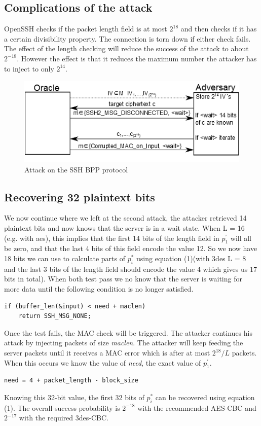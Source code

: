 \documentclass[twocolumn]{article}
\begin{document}
\subsection*{Complications of the attack}
OpenSSH checks if the packet length field is at most $2^{18}$ and then checks if it has a certain divisibility property. The connection is torn down if either check fails. The effect of the length checking will reduce the success of the attack to about $2^{-18}$. However the effect is that it reduces the maximum number the attacker has to inject to only $2^{14}$.

\begin{figure}
	  \centering
    	\includegraphics[scale=.7]{drawing.png}
	\caption{Attack on the SSH BPP protocol~\cite{Albrecht2009}}
	\label{fig:BPPAttack}
\end{figure}

\subsection*{Recovering 32 plaintext bits}
We now continue where we left at the second attack, the attacker retrieved 14 plaintext bits and now knows that the server is in a wait state. When L = 16 (e.g. with aes), this implies that the first 14 bits of the length field in $p^{'}_1$ will all be zero, and that the last 4 bits of this field encode the value 12. So we now have 18 bits we can use to calculate parts of $p^*_i$ using equation (1)(with 3des L = 8 and the last 3 bits of the length field should encode the value 4 which gives us 17 bits in total). When both test pass we no know that the server is waiting for more data until the following condition is no longer satisfied.
\begin{verbatim}
if (buffer_len(&input) < need + maclen)
	return SSH_MSG_NONE;
\end{verbatim}
Once the test fails, the MAC check will be triggered. The attacker continues his attack by injecting packets of size \emph{maclen}. The attacker will keep feeding the server packets until it receives a MAC error which is after at most $2^{18}/L$ packets. When this occurs we know the value of \emph{need}, the exact value of $p_1^{'}$.
\begin{verbatim}
need = 4 + packet_length - block_size
\end{verbatim}
Knowing this 32-bit value, the first 32 bits of $p^*_i$ can be recovered using equation (1).
The overall success probability is $2^{-18}$ with the recommended AES-CBC and $2^{-17}$ with the required 3des-CBC.
\end{document}
